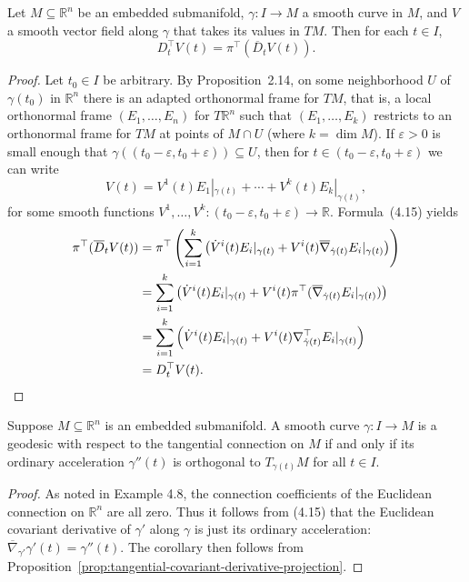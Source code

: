 \begin{proposition}
\label{prop:tangential-covariant-derivative-projection}

Let $M \subseteq \mathbb{R}^n$ be an embedded submanifold, $\gamma: I \to M$ a smooth curve in $M$, and $V$ a smooth vector field along $\gamma$ that takes its values in $TM$. Then for each $t \in I$,
\[
D_t^\top V(t) = \pi^\top(\overline{D}_t V(t)).
\]

\begin{proof}
Let $t_0 \in I$ be arbitrary. By Proposition~2.14, on some neighborhood $U$ of $\gamma(t_0)$ in $\mathbb{R}^n$ there is an adapted orthonormal frame for $TM$, that is, a local orthonormal frame $(E_1,\ldots,E_n)$ for $T\mathbb{R}^n$ such that $(E_1,\ldots,E_k)$ restricts to an orthonormal frame for $TM$ at points of $M \cap U$ (where $k = \dim M$). If $\varepsilon > 0$ is small enough that $\gamma((t_0 - \varepsilon, t_0 + \varepsilon)) \subseteq U$, then for $t \in (t_0 - \varepsilon, t_0 + \varepsilon)$ we can write
\[
V(t) = V^1(t)E_1|_{\gamma(t)} + \cdots + V^k(t)E_k|_{\gamma(t)},
\]
for some smooth functions $V^1,\ldots,V^k: (t_0 - \varepsilon, t_0 + \varepsilon) \to \mathbb{R}$. Formula~(4.15) yields
\begin{align*}
\pi^\top(\overline{D}_t V(t)) &= \pi^\top\left(\sum_{i=1}^k \left(\dot{V}^i(t)E_i|_{\gamma(t)} + V^i(t)\overline{\nabla}_{\dot{\gamma}(t)} E_i|_{\gamma(t)}\right)\right) \\
&= \sum_{i=1}^k \left(\dot{V}^i(t)E_i|_{\gamma(t)} + V^i(t)\pi^\top(\overline{\nabla}_{\dot{\gamma}(t)} E_i|_{\gamma(t)})\right) \\
&= \sum_{i=1}^k \left(\dot{V}^i(t)E_i|_{\gamma(t)} + V^i(t)\nabla^\top_{\dot{\gamma}(t)} E_i|_{\gamma(t)}\right) \\
&= D_t^\top V(t). \qedhere
\end{align*}
\end{proof}
\end{proposition}

\begin{corollary}
\label{cor:geodesic-submanifold-acceleration}

Suppose $M \subseteq \mathbb{R}^n$ is an embedded submanifold. A smooth curve $\gamma: I \to M$ is a geodesic with respect to the tangential connection on $M$ if and only if its ordinary acceleration $\gamma''(t)$ is orthogonal to $T_{\gamma(t)}M$ for all $t \in I$.

\begin{proof}
As noted in Example 4.8, the connection coefficients of the Euclidean connection on $\mathbb{R}^n$ are all zero. Thus it follows from (4.15) that the Euclidean covariant derivative of $\gamma'$ along $\gamma$ is just its ordinary acceleration: $\overline{\nabla}_{\gamma'}\gamma'(t) = \gamma''(t)$. The corollary then follows from Proposition~\ref{prop:tangential-covariant-derivative-projection}.
\end{proof}
\end{corollary}

